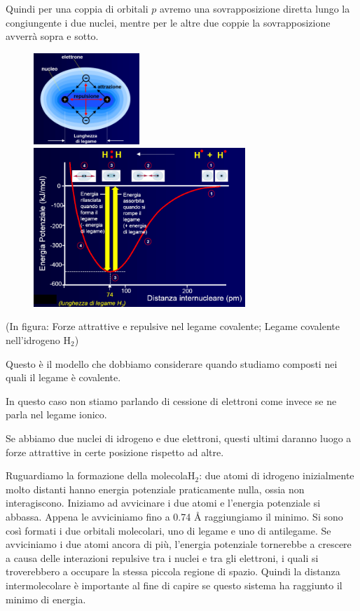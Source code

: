 Quindi per una coppia di orbitali $p$ avremo una sovrapposizione diretta lungo la congiungente i due nuclei, mentre per le altre due coppie la sovrapposizione avverrà sopra e sotto.

\begin{figure}[!tbp]
    \centering
    {\includegraphics[width=4cm]{immagini/forze_legame_covalente.png}\label{fig:f5}}
    \hfill
    {\includegraphics[width=8cm]{immagini/legame_covalente_H_2.png}\label{fig:f6}}
\end{figure}

(In figura: Forze attrattive e repulsive nel legame covalente; Legame covalente nell'idrogeno H$_2$) 

\vspace{0.2cm}Questo è il modello che dobbiamo considerare quando studiamo composti nei quali il legame è covalente.

In questo caso non stiamo parlando di cessione di elettroni come invece se ne parla nel legame ionico.

Se abbiamo due nuclei di idrogeno e due elettroni, questi ultimi daranno luogo a forze attrattive in certe posizione rispetto ad altre.

Ruguardiamo la formazione della molecolaH$_2$: due atomi di idrogeno inizialmente molto distanti hanno energia potenziale praticamente nulla, ossia non interagiscono. Iniziamo ad avvicinare i due atomi e l'energia potenziale si abbassa. Appena le avviciniamo fino a 0.74 Å raggiungiamo il minimo. Si sono così formati i due orbitali molecolari, uno di legame e uno di antilegame. Se avviciniamo i due atomi ancora di più, l'energia potenziale tornerebbe a crescere a causa delle interazioni repulsive tra i nuclei e tra gli elettroni, i quali si troverebbero a occupare la stessa piccola regione di spazio. Quindi la distanza intermolecolare è importante al fine di capire se questo sistema ha raggiunto il minimo di energia.

